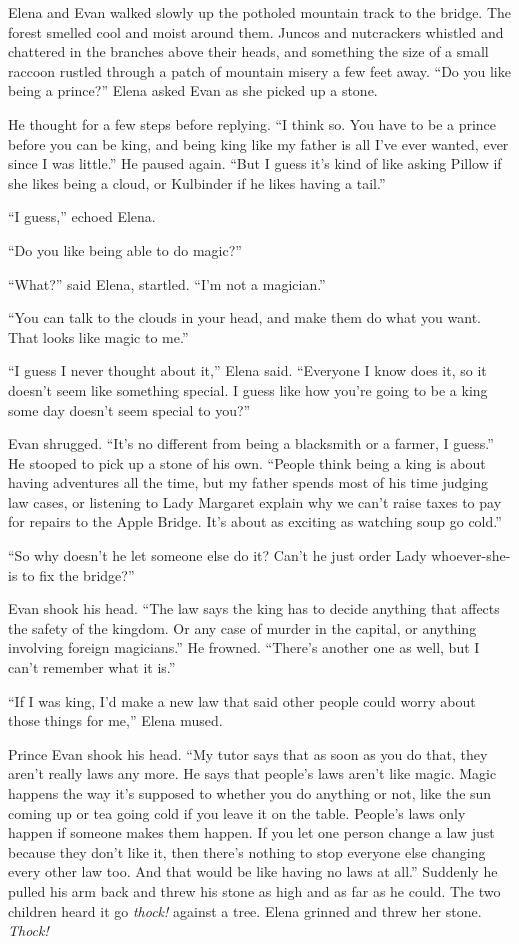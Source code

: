 \documentclass[10pt]{book}
\begin{document}
Elena and Evan walked slowly up the potholed mountain track to the bridge. The forest smelled cool and moist around them. Juncos and nutcrackers whistled and chattered in the branches above their heads, and something the size of a small raccoon rustled through a patch of mountain misery a few feet away. ``Do you like being a prince?'' Elena asked Evan as she picked up a stone.

He thought for a few steps before replying. ``I think so. You have to be a prince before you can be king, and being king like my father is all I've ever wanted, ever since I was little.'' He paused again. ``But I guess it's kind of like asking Pillow if she likes being a cloud, or Kulbinder if he likes having a tail.''

``I guess,'' echoed Elena.

``Do you like being able to do magic?''

``What?'' said Elena, startled. ``I'm not a magician.''

``You can talk to the clouds in your head, and make them do what you want. That looks like magic to me.''

``I guess I never thought about it,'' Elena said. ``Everyone I know does it, so it doesn't seem like something special.  I guess like how you're going to be a king some day doesn't seem special to you?''

Evan shrugged. ``It's no different from being a blacksmith or a farmer, I guess.'' He stooped to pick up a stone of his own. ``People think being a king is about having adventures all the time, but my father spends most of his time judging law cases, or listening to Lady Margaret explain why we can't raise taxes to pay for repairs to the Apple Bridge.  It's about as exciting as watching soup go cold.''

``So why doesn't he let someone else do it? Can't he just order Lady whoever-she-is to fix the bridge?''

Evan shook his head. ``The law says the king has to decide anything that affects the safety of the kingdom. Or any case of murder in the capital, or anything involving foreign magicians.'' He frowned. ``There's another one as well, but I can't remember what it is.''

``If I was king, I'd make a new law that said other people could worry about those things for me,'' Elena mused.

Prince Evan shook his head. ``My tutor says that as soon as you do that, they aren't really laws any more. He says that people's laws aren't like magic. Magic happens the way it's supposed to whether you do anything or not, like the sun coming up or tea going cold if you leave it on the table. People's laws only happen if someone makes them happen. If you let one person change a law just because they don't like it, then there's nothing to stop everyone else changing every other law too. And that would be like having no laws at all.'' Suddenly he pulled his arm back and threw his stone as high and as far as he could. The two children heard it go \emph{thock!} against a tree. Elena grinned and threw her stone. \emph{Thock!}
\end{document}
